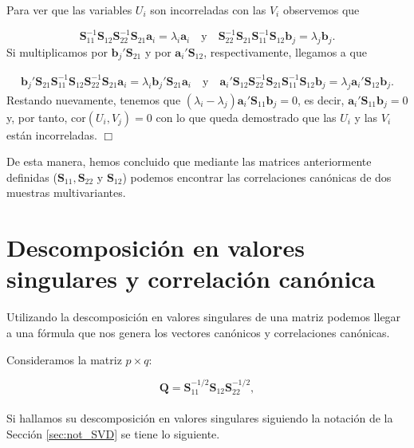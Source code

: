 \documentclass[tfg,cienciasbased,lot,lof,covers,final,overleaf,nocopyright]{tfgtfmthesisuam}
\begin{document}
Para ver que las variables $U_i$ son incorreladas con las $V_i$ observemos que

\begin{equation*}
    \mathbf{S}_{11}^{-1} \mathbf{S}_{12} \mathbf{S}_{22}^{-1} \mathbf{S}_{21}\mathbf{a}_i = \lambda_i\mathbf{a}_i \quad \mbox{y} \quad
    \mathbf{S}_{22}^{-1} \mathbf{S}_{21} \mathbf{S}_{11}^{-1} \mathbf{S}_{12}\mathbf{b}_j = \lambda_j\mathbf{b}_j.
\end{equation*}
Si multiplicamos por $\mathbf{b}_j'\mathbf{S}_{21}$ y por $\mathbf{a}_i'\mathbf{S}_{12}$, respectivamente, llegamos a que

\begin{eqnarray*}
    \mathbf{b}_j'\mathbf{S}_{21}\mathbf{S}_{11}^{-1} \mathbf{S}_{12} \mathbf{S}_{22}^{-1} \mathbf{S}_{21}\mathbf{a}_i = \lambda_i\mathbf{b}_j'\mathbf{S}_{21}\mathbf{a}_i \quad \mbox{y} \quad
    \mathbf{a}_i'\mathbf{S}_{12}\mathbf{S}_{22}^{-1} \mathbf{S}_{21} \mathbf{S}_{11}^{-1} \mathbf{S}_{12}\mathbf{b}_j = \lambda_j\mathbf{a}_i'\mathbf{S}_{12}\mathbf{b}_j.
\end{eqnarray*}
Restando nuevamente, tenemos que $(\lambda_i - \lambda_j) \mathbf{a}_i'\mathbf{S}_{11}\mathbf{b}_j = 0$, es decir, $\mathbf{a}_i'\mathbf{S}_{11}\mathbf{b}_j = 0$ y, por tanto, $\mbox{cor}(U_i, V_j) = 0$ con lo que queda demostrado que las $U_i$ y las $V_i$ están incorreladas. \hfill $\Box$

De esta manera, hemos concluido que mediante las matrices anteriormente definidas ($\mathbf{S}_{11}, \mathbf{S}_{22}$ y $\mathbf{S}_{12}$) podemos encontrar las correlaciones canónicas de dos muestras multivariantes.

\section{Descomposición en valores singulares y correlación canónica}
Utilizando la descomposición en valores singulares de una matriz podemos llegar a una fórmula que nos genera los vectores canónicos y correlaciones canónicas.

Consideramos la matriz $p \times q$:

\begin{equation*}
    \mathbf{Q} = \mathbf{S}_{11}^{-1/2}\mathbf{S}_{12}\mathbf{S}_{22}^{-1/2},
\end{equation*}\\
Si hallamos su descomposición en valores singulares siguiendo la notación de la Sección \ref{sec:not_SVD} se tiene lo siguiente.
\end{document}
